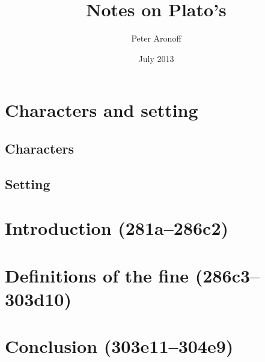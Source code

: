 \documentclass[11pt]{article}
\begin{document}
\begin{titlepage}
\title{Notes on Plato's }
\author{Peter Aronoff}
\date{July 2013}
\maketitle
\end{titlepage}

\section{Characters and setting}


\subsection{Characters}


\subsection{Setting}


\section{Introduction (281a--286c2)}



\section{Definitions of the fine (286c3--303d10)}



\section{Conclusion (303e11--304e9)}




\newpage


\end{document}
